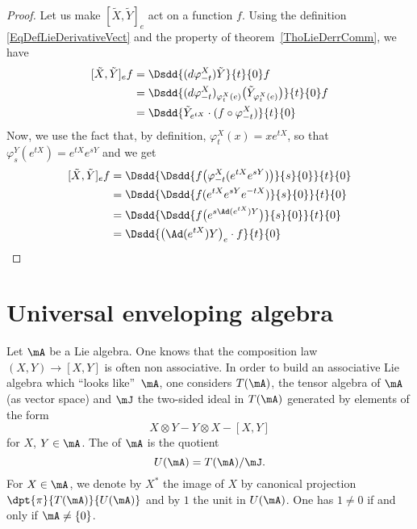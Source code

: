 \begin{proof}
	Let us make $[\tilde X,\tilde Y]_e$ act on a function $f$. Using the definition \eqref{EqDefLieDerivativeVect} and the property of theorem~\ref{ThoLieDerrComm}, we have
	\begin{equation}
		\begin{aligned}[]
			[\tilde X,\tilde Y]_ef&=\Dsdd{ (d\varphi_{-t}^X)\tilde Y }{t}{0}f\\
			&=\Dsdd{ (d\varphi_{-t}^X)_{\varphi_t^X(e)}\big( \tilde Y_{\varphi_t^X(e)} \big) }{t}{0}f\\
			&=\Dsdd{ \tilde Y_{ e^{tX}}\cdot(f\circ\varphi_{-t}^X) }{t}{0}
		\end{aligned}
	\end{equation}
	Now, we use the fact that, by definition, $\varphi_t^X(x)=x e^{tX}$, so that $\varphi_s^Y( e^{tX})= e^{tX} e^{sY}$ and we get
	\begin{equation}
		\begin{aligned}[]
			[\tilde X,\tilde Y]_ef&=\Dsdd{ \Dsdd{ f\big( \varphi_{-t}^X( e^{tX} e^{sY}) \big) }{s}{0} }{t}{0}\\
			&=\Dsdd { \Dsdd{ f( e^{tX} e^{sY} e^{-tX}) }{s}{0} } {t}{0}\\
			&=\Dsdd{ \Dsdd{ f\big(  e^{s\Ad( e^{tX})Y} \big) }{s}{0} }{t}{0}\\
			&=\Dsdd{ \big( \Ad( e^{tX})Y \big)_e\cdot f }{t}{0}
		\end{aligned}
	\end{equation}

\end{proof}

\section{Universal enveloping algebra}  \label{subsec:env_alg}

Let $\mA$ be a Lie algebra. One knows that the composition law $(X,Y)\to[X,Y]$ is often non associative. In order to build an associative Lie algebra which ``looks like''\ $\mA$, one considers $T(\mA)$, the tensor algebra of $\mA$ (as vector space) and $\mJ$ the two-sided ideal in $T(\mA)$ generated by elements of the form
\[
   X\otimes Y-Y\otimes X -[X,Y]
\]
for $X$, $Y\in\mA$. The  of $\mA$ is the quotient 
\begin{equation}
     U(\mA)=T(\mA)/\mJ.
\end{equation}
For $X\in\mA$, we denote by $X^*$ the image of $X$ by canonical projection $\dpt{\pi}{T(\mA)}{U(\mA)}$ and by $1$ the unit in $U(\mA)$. One has $1\neq 0$ if and only if $\mA\neq\{0\}$.

